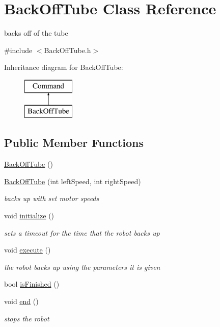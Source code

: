 \hypertarget{classBackOffTube}{\section{Back\-Off\-Tube Class Reference}
\label{classBackOffTube}
}


backs off of the tube  




{\ttfamily \#include $<$Back\-Off\-Tube.\-h$>$}

Inheritance diagram for Back\-Off\-Tube\-:\begin{figure}[H]
\begin{center}
\leavevmode
\includegraphics[height=2.000000cm]{classBackOffTube}
\end{center}
\end{figure}
\subsection*{Public Member Functions}
\begin{DoxyCompactItemize}
\item 
\hyperlink{classBackOffTube_ab8fb886043a6df04258ac22415b543dd}{Back\-Off\-Tube} ()
\item 
\hyperlink{classBackOffTube_a6fedeb5bfc92b531a300ce2d95a1a3bb}{Back\-Off\-Tube} (int left\-Speed, int right\-Speed)
\begin{DoxyCompactList}\small\item\em backs up with set motor speeds \end{DoxyCompactList}\item 
void \hyperlink{classBackOffTube_a16b83364009db3cb58ec6c09458a8741}{initialize} ()
\begin{DoxyCompactList}\small\item\em sets a timeout for the time that the robot backs up \end{DoxyCompactList}\item 
void \hyperlink{classBackOffTube_a9d40125cdd95f7ca2db13a5d48e91a93}{execute} ()
\begin{DoxyCompactList}\small\item\em the robot backs up using the parameters it is given \end{DoxyCompactList}\item 
bool \hyperlink{classBackOffTube_abda2334a9432829830a51195a9cce4e6}{is\-Finished} ()
\item 
void \hyperlink{classBackOffTube_a6753fa3b5148d3b8cc06b8e2f7f02be7}{end} ()
\begin{DoxyCompactList}\small\item\em stops the robot \end{DoxyCompactList}\end{DoxyCompactItemize}
